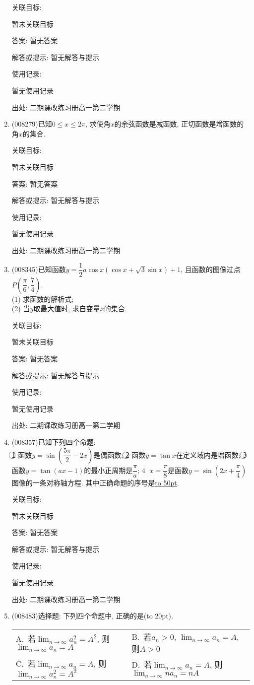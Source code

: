 \documentclass[10pt,a4paper]{article}
\newcommand{\blank}[1]{\underline{\hbox to #1pt{}}}
\newcommand{\bracket}[1]{(\hbox to #1pt{})}
\newcommand{\twoch}[4]{\par\begin{tabular}{p{.46\textwidth}p{.46\textwidth}}
A.~#1& B.~#2\\
C.~#3& D.~#4
\end{tabular}}
\begin{document}
\begin{enumerate}[1.]
关联目标:

暂未关联目标

答案: 暂无答案

解答或提示: 暂无解答与提示

使用记录:

暂无使用记录


出处: 二期课改练习册高一第二学期
\item { (008279)}已知$0\le x\le 2\pi$, 求使角$x$的余弦函数是减函数, 正切函数是增函数的角$x$的集合.


关联目标:

暂未关联目标

答案: 暂无答案

解答或提示: 暂无解答与提示

使用记录:

暂无使用记录


出处: 二期课改练习册高一第二学期
\item { (008345)}已知函数$y=\dfrac 12a\cos x(\cos x+\sqrt 3\sin x)+1$, 且函数的图像过点$P(\dfrac{\pi}6,\dfrac 74)$.\\
(1) 求函数的解析式;\\
(2) 当$y$取最大值时, 求自变量$x$的集合.


关联目标:

暂未关联目标

答案: 暂无答案

解答或提示: 暂无解答与提示

使用记录:

暂无使用记录


出处: 二期课改练习册高一第二学期
\item { (008357)}已知下列四个命题:\\
\textcircled{1} 函数$y=\sin (\dfrac{5\pi}2-2x)$是偶函数;
\textcircled{2} 函数$y=\tan x$在定义域内是增函数;
\textcircled{3} 函数$y=\tan (ax-1)$的最小正周期是$\dfrac{\pi}a$;
\textcircled{4} $x=\dfrac{\pi}8$是函数$y=\sin (2x+\dfrac{\pi}4)$图像的一条对称轴方程.
其中正确命题的序号是\blank{50}.


关联目标:

暂未关联目标

答案: 暂无答案

解答或提示: 暂无解答与提示

使用记录:

暂无使用记录


出处: 二期课改练习册高一第二学期
\item { (008483)}选择题:
下列四个命题中, 正确的是\bracket{20}.
\twoch{若$\displaystyle\lim_{n\to\infty}a_n^2=A^2$, 则$\displaystyle\lim_{n\to\infty}a_n=A$}{若$a_n>0$, $\displaystyle\lim_{n\to\infty}a_n=A$, 则$A>0$}{若$\displaystyle\lim_{n\to\infty}a_n=A$, 则$\displaystyle\lim_{n\to\infty}a_n^2=A^2$}{若$\displaystyle\lim_{n\to\infty}a_n=A$, 则$\displaystyle\lim_{n\to\infty}na_n=nA$}



\end{enumerate}
\end{document}
